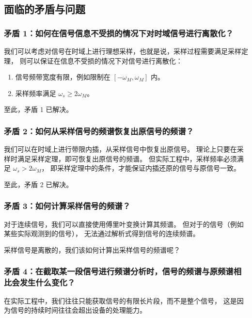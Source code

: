 \subsection{面临的矛盾与问题}

\subsubsection{矛盾 1：如何在信号信息不受损的情况下对时域信号进行离散化？}

我们可以考虑对信号在时域上进行理想采样，也就是说，采样过程需要满足采样定理，
则可以保证在信息不受损的情况下对信号进行离散化：

\begin{enumerate}[label=(\arabic*)]
    \item 信号频带宽度有限，例如限制在 $[-\omega_M, \omega_M]$ 内。
    \item 采样频率满足 $\omega_s \ge 2\omega_M$。
\end{enumerate}

至此，矛盾 1 已解决。

\subsubsection{矛盾 2：如何从采样信号的频谱恢复出原信号的频谱？}

我们可以在时域上进行带限内插，从采样信号中恢复出原信号。
理论上只要在采样时满足采样定理，即可恢复出原信号的频谱。
但实际工程中，采样频率必须满足 $\omega_s > 2\omega_M$，
即采样定理中的条件，才能保证内插还原的信号与原信号一致。

至此，矛盾 2 已解决。

\subsubsection{矛盾 3：如何计算采样信号的频谱？}

对于连续信号，我们可以直接使用傅里叶变换计算其频谱。
但对于的信号（例如某些实际观测到的信号），
无法通过解析式得到信号的连续频谱。

采样信号是离散的，我们该如何计算出采样信号的频谱呢？

\subsubsection{矛盾 4：在截取某一段信号进行频谱分析时，信号的频谱与原频谱相比会发生什么变化？}

在实际工程中，我们往往只能获取信号的有限长片段，而不是整个信号，
这是因为信号的持续时间往往会超出设备的处理能力。

